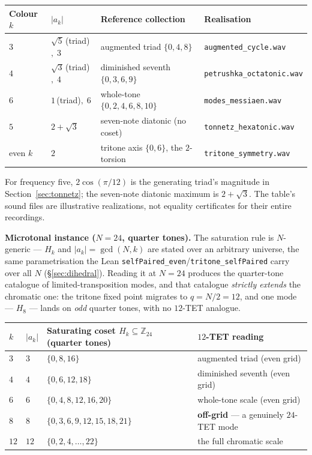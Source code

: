 \documentclass[11pt]{article}
\newcommand{\lean}[1]{\texttt{#1}}
\newcommand{\Zn}[1]{\mathbb{Z}_{#1}}
\begin{document}
\begin{table}[h]\centering\footnotesize\setlength{\tabcolsep}{5pt}
\begin{tabular}{@{}p{} p{} p{} p{}@{}}
\toprule
\rowcolor{ctA!22}
\textbf{Colour $k$} & \textbf{$|a_k|$} & \textbf{Reference collection} & \textbf{Realisation}\\
\midrule
$3$ & $\sqrt5\,$(triad)$,\;3$ & augmented triad $\{0,4,8\}$ & \lean{augmented\_cycle.wav}\\
$4$ & $\sqrt3\,$(triad)$,\;4$ & diminished seventh $\{0,3,6,9\}$ & \lean{petrushka\_octatonic.wav}\\
$6$ & $1\,$(triad)$,\;6$ & whole-tone $\{0,2,4,6,8,10\}$ & \lean{modes\_messiaen.wav}\\
$5$ & $2+\sqrt3$ & seven-note diatonic (no coset) & \lean{tonnetz\_hexatonic.wav}\\
even $k$ & $2$ & tritone axis $\{0,6\}$, the $2$-torsion & \lean{tritone\_symmetry.wav}\\
\bottomrule
\end{tabular}
\end{table}

For frequency five, $2\cos(\pi/12)$ is the generating triad's magnitude in
Section~\ref{sec:tonnetz}; the seven-note diatonic maximum is $2+\sqrt3$.
The table's sound files are illustrative realizations, not equality certificates for their entire recordings.

\textbf{Microtonal instance ($N=24$, quarter tones).} The saturation rule is $N$-generic --- $H_k$ and
$|a_k|=\gcd(N,k)$ are stated over an arbitrary universe, the same parametrisation the Lean
\lean{selfPaired\_even}/\lean{tritone\_selfPaired} carry over all $N$ (\S\ref{sec:dihedral}). Reading it at
$N=24$ produces the quarter-tone catalogue of limited-transposition modes, and that catalogue \emph{strictly
extends} the chromatic one: the tritone fixed point migrates to $q=N/2=12$, and one mode --- $H_8$ --- lands
on \emph{odd} quarter tones, with no $12$-TET analogue.

\begin{table}[h]\centering\footnotesize\setlength{\tabcolsep}{5pt}
\begin{tabular}{@{}p{} p{} p{} p{}@{}}
\toprule
\rowcolor{ctB!22}
\textbf{$k$} & \textbf{$|a_k|$} & \textbf{Saturating coset $H_k\subseteq\Zn{24}$ (quarter tones)} & \textbf{$12$-TET reading}\\
\midrule
$3$  & $3$  & $\{0,8,16\}$ & augmented triad (even grid)\\
$4$  & $4$  & $\{0,6,12,18\}$ & diminished seventh (even grid)\\
$6$  & $6$  & $\{0,4,8,12,16,20\}$ & whole-tone scale (even grid)\\
$8$  & $8$  & $\{0,3,6,9,12,15,18,21\}$ & \textbf{off-grid} --- a genuinely $24$-TET mode\\
$12$ & $12$ & $\{0,2,4,\dots,22\}$ & the full chromatic scale\\
\bottomrule
\end{tabular}
\end{table}
\end{document}
